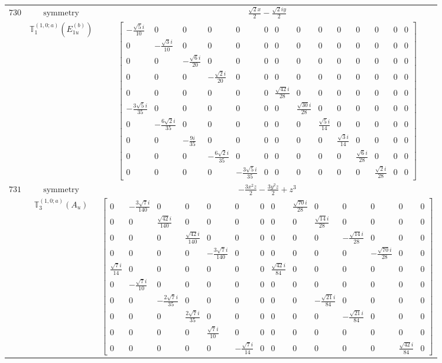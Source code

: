 \documentclass[fleqn,8pt,landscape]{jsarticle}
\begin{document}
\begin{longtable}{ccc}
$ 730 $ & $ \text{symmetry} $ & $ \frac{\sqrt{2} x}{2} - \frac{\sqrt{2} i y}{2} $ \\
$  $ & $ \mathbb{T}_{1}^{(1,0;a)}(E_{1u}^{(b)}) $ & $ \begin{bmatrix} - \frac{\sqrt{5} i}{10} & 0 & 0 & 0 & 0 & 0 & 0 & 0 & 0 & 0 & 0 & 0 & 0 & 0 \\ 0 & - \frac{\sqrt{3} i}{10} & 0 & 0 & 0 & 0 & 0 & 0 & 0 & 0 & 0 & 0 & 0 & 0 \\ 0 & 0 & - \frac{\sqrt{6} i}{20} & 0 & 0 & 0 & 0 & 0 & 0 & 0 & 0 & 0 & 0 & 0 \\ 0 & 0 & 0 & - \frac{\sqrt{2} i}{20} & 0 & 0 & 0 & 0 & 0 & 0 & 0 & 0 & 0 & 0 \\ 0 & 0 & 0 & 0 & 0 & 0 & \frac{\sqrt{42} i}{28} & 0 & 0 & 0 & 0 & 0 & 0 & 0 \\ - \frac{3 \sqrt{5} i}{35} & 0 & 0 & 0 & 0 & 0 & 0 & \frac{\sqrt{30} i}{28} & 0 & 0 & 0 & 0 & 0 & 0 \\ 0 & - \frac{6 \sqrt{2} i}{35} & 0 & 0 & 0 & 0 & 0 & 0 & \frac{\sqrt{5} i}{14} & 0 & 0 & 0 & 0 & 0 \\ 0 & 0 & - \frac{9 i}{35} & 0 & 0 & 0 & 0 & 0 & 0 & \frac{\sqrt{3} i}{14} & 0 & 0 & 0 & 0 \\ 0 & 0 & 0 & - \frac{6 \sqrt{2} i}{35} & 0 & 0 & 0 & 0 & 0 & 0 & \frac{\sqrt{6} i}{28} & 0 & 0 & 0 \\ 0 & 0 & 0 & 0 & - \frac{3 \sqrt{5} i}{35} & 0 & 0 & 0 & 0 & 0 & 0 & \frac{\sqrt{2} i}{28} & 0 & 0 \end{bmatrix} $ \\ \hline
$ 731 $ & $ \text{symmetry} $ & $ - \frac{3 x^{2} z}{2} - \frac{3 y^{2} z}{2} + z^{3} $ \\
$  $ & $ \mathbb{T}_{3}^{(1,0;a)}(A_{u}) $ & $ \begin{bmatrix} 0 & - \frac{3 \sqrt{7} i}{140} & 0 & 0 & 0 & 0 & 0 & 0 & \frac{\sqrt{70} i}{28} & 0 & 0 & 0 & 0 & 0 \\ 0 & 0 & \frac{\sqrt{42} i}{140} & 0 & 0 & 0 & 0 & 0 & 0 & \frac{\sqrt{14} i}{28} & 0 & 0 & 0 & 0 \\ 0 & 0 & 0 & \frac{\sqrt{42} i}{140} & 0 & 0 & 0 & 0 & 0 & 0 & - \frac{\sqrt{14} i}{28} & 0 & 0 & 0 \\ 0 & 0 & 0 & 0 & - \frac{3 \sqrt{7} i}{140} & 0 & 0 & 0 & 0 & 0 & 0 & - \frac{\sqrt{70} i}{28} & 0 & 0 \\ \frac{\sqrt{7} i}{14} & 0 & 0 & 0 & 0 & 0 & 0 & \frac{\sqrt{42} i}{84} & 0 & 0 & 0 & 0 & 0 & 0 \\ 0 & - \frac{\sqrt{7} i}{10} & 0 & 0 & 0 & 0 & 0 & 0 & 0 & 0 & 0 & 0 & 0 & 0 \\ 0 & 0 & - \frac{2 \sqrt{7} i}{35} & 0 & 0 & 0 & 0 & 0 & 0 & - \frac{\sqrt{21} i}{84} & 0 & 0 & 0 & 0 \\ 0 & 0 & 0 & \frac{2 \sqrt{7} i}{35} & 0 & 0 & 0 & 0 & 0 & 0 & - \frac{\sqrt{21} i}{84} & 0 & 0 & 0 \\ 0 & 0 & 0 & 0 & \frac{\sqrt{7} i}{10} & 0 & 0 & 0 & 0 & 0 & 0 & 0 & 0 & 0 \\ 0 & 0 & 0 & 0 & 0 & - \frac{\sqrt{7} i}{14} & 0 & 0 & 0 & 0 & 0 & 0 & \frac{\sqrt{42} i}{84} & 0 \end{bmatrix} $ \\ \hline

\end{longtable}
\end{document}
